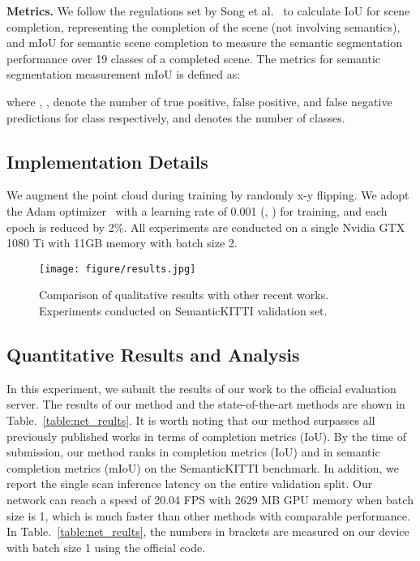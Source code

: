 \documentclass[letterpaper, 10 pt, conference]{ieeeconf}
\begin{document}
\textbf{Metrics.}
We follow the regulations set by Song et al.~\cite{song2017semantic} to calculate IoU for scene completion, representing the completion of the scene (not involving semantics), and mIoU for semantic scene completion to measure the semantic segmentation performance over 19 classes of a completed scene. The metrics for semantic segmentation measurement mIoU is defined as:

where , ,  denote the number of true positive, false positive, and false negative predictions for class  respectively, and  denotes the number of classes.

\subsection{Implementation Details}

We augment the point cloud during training by randomly x-y flipping. We adopt the Adam optimizer~\cite{kingma2014adam} with a learning rate of 0.001 (, ) for training, and each epoch is reduced by 2\%. All experiments are conducted on a single Nvidia GTX 1080 Ti with 11GB memory with batch size 2. 

\begin{figure*}[t]
	\centering
	\texttt{[image: figure/results.jpg]}
	\caption{Comparison of qualitative results with other recent works. Experiments conducted on SemanticKITTI validation set.}
	\label{fig:results}
\end{figure*}

\subsection{Quantitative Results and Analysis}

In this experiment, we submit the results of our work to the official evaluation server. The results of our method and the state-of-the-art methods are shown in Table.~\ref{table:net_reults}. It is worth noting that our method surpasses all previously published works in terms of completion metrics (IoU). By the time of submission, our method ranks  in completion metrics (IoU) and  in semantic completion metrics (mIoU) on the SemanticKITTI benchmark. In addition, we report the single scan inference latency on the entire validation split. Our network can reach a speed of 20.04 FPS with 2629 MB GPU memory when batch size is 1, which is much faster than other methods with comparable performance. In Table.~\ref{table:net_reults}, the numbers in brackets are measured on our device with batch size 1 using the official code.
\end{document}
